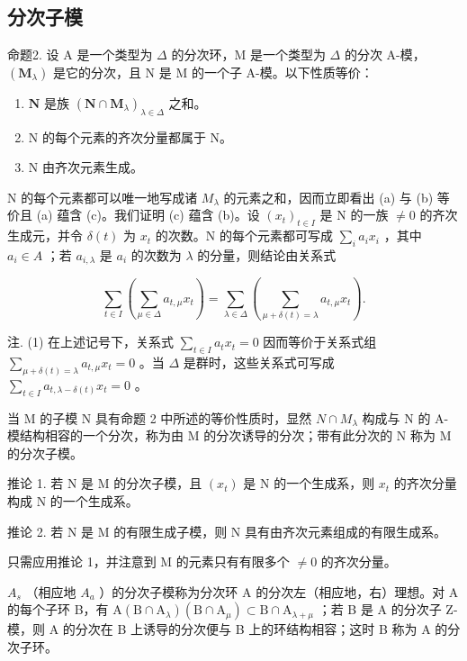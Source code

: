 \subsection{分次子模}

命题2. 设 A 是一个类型为 \(\Delta\) 的分次环，M 是一个类型为 \(\Delta\) 的分次 A-模， \((\mathbf{M}_{\lambda})\) 是它的分次，且 N 是 M 的一个子 A-模。以下性质等价：

\begin{enumerate}
\def\labelenumi{(\alph{enumi})}
\item
  \(\mathbf{N}\) 是族 \((\mathbf{N} \cap \mathbf{M}_{\lambda})_{\lambda \in \Delta}\) 之和。
\item
  N 的每个元素的齐次分量都属于 N。
\item
  N 由齐次元素生成。
\end{enumerate}

N 的每个元素都可以唯一地写成诸 \(M_{\lambda}\) 的元素之和，因而立即看出 (a) 与 (b) 等价且 (a) 蕴含 (c)。我们证明 (c) 蕴含 (b)。设 \((x_{t})_{t\in I}\) 是 N 的一族 \(\neq0\) 的齐次生成元，并令 \(\delta(t)\) 为 \(x_{t}\) 的次数。N 的每个元素都可写成 \(\sum_{i}a_{i}x_{i}\) ，其中 \(a_{i}\in A\) ；若 \(a_{i,\lambda}\) 是 \(a_{i}\) 的次数为 \(\lambda\) 的分量，则结论由关系式

\[
\sum_ {t \in I} \left(\sum_ {\mu \in \Delta} a _ {t, \mu} x _ {t}\right) = \sum_ {\lambda \in \Delta} \left(\sum_ {\mu + \delta (t) = \lambda} a _ {t, \mu} x _ {t}\right).
\]

注. (1) 在上述记号下，关系式 \(\sum_{t\in I}a_t x_t = 0\) 因而等价于关系式组 \(\sum_{\mu +\delta (t) = \lambda}a_{t,\mu}x_{t} = 0\) 。当 \(\Delta\) 是群时，这些关系式可写成 \(\sum_{t\in I}a_{t,\lambda -\delta (t)}x_{t} = 0\) 。

当 M 的子模 N 具有命题 2 中所述的等价性质时，显然 \(N \cap M_{\lambda}\) 构成与 N 的 A-模结构相容的一个分次，称为由 M 的分次诱导的分次；带有此分次的 N 称为 M 的分次子模。

推论 1. 若 N 是 M 的分次子模，且 \((x_{t})\) 是 N 的一个生成系，则 \(x_{t}\) 的齐次分量构成 N 的一个生成系。

推论 2. 若 N 是 M 的有限生成子模，则 N 具有由齐次元素组成的有限生成系。

只需应用推论 1，并注意到 M 的元素只有有限多个 \(\neq0\) 的齐次分量。

\(A_{s}\) （相应地 \(A_{a}\) ）的分次子模称为分次环 A 的分次左（相应地，右）理想。对 A 的每个子环 B，有 \(\mathrm{A}(\mathrm{B} \cap \mathrm{A}_{\lambda})(\mathrm{B} \cap \mathrm{A}_{\mu}) \subset \mathrm{B} \cap \mathrm{A}_{\lambda + \mu}\) ；若 B 是 A 的分次子 Z-模，则 A 的分次在 B 上诱导的分次便与 B 上的环结构相容；这时 B 称为 A 的分次子环。

